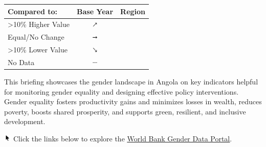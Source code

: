 \documentclass[
]{article}
\author{}
\date{\vspace{-2.5em}}
\begin{document}

\begin{table}\begingroup\fontsize{8}{10}\selectfont

\begin{tabular}[t]{lcl}

\textbf{Compared to:} & \textbf{Base Year} & \textbf{Region}\\
\midrule
>10\% Higher Value & \includegraphics[width=0.1in, height=0.1in]{upicon.png} & \cellcolor[HTML]{21908C}{}\\
Equal/No Change & \includegraphics[width=0.1in, height=0.1in]{righticon.png} & \cellcolor[HTML]{34608D}{}\\
>10\% Lower Value & \includegraphics[width=0.1in, height=0.1in]{downicon.png} & \cellcolor[HTML]{482576}{}\\
No Data & \includegraphics[width=0.1in, height=0.1in]{naicon.png} & \cellcolor{gray}{}\\

\end{tabular}
\endgroup{}\end{table}
\begin{minipage}[t][1.7cm][t]{12cm}
\fontsize{9}{8}\selectfont\raggedright
This briefing showcases the gender landscape in Angola on key indicators helpful for monitoring gender equality and designing effective policy interventions. Gender equality fosters productivity gains and minimizes losses in wealth, reduces poverty, boosts shared prosperity, and supports green, resilient, and inclusive development. 

\includegraphics[width=10pt]{pointer.png} Click the links below to explore the \underline{\href{https://genderdata.worldbank.org/}{World Bank Gender Data Portal}}.
\end{minipage}
\vspace{8pt}
\end{document}
